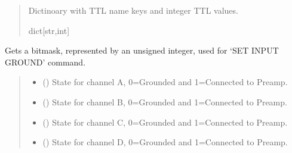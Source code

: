 \documentclass[letterpaper,10pt,english]{sphinxmanual}
\begin{document}
\begin{fulllineitems}
\begin{fulllineitems}
\begin{quote}
\begin{description}
\sphinxAtStartPar
Dictinoary with TTL name keys and integer TTL values.

\sphinxAtStartPar
dict{[}str,int{]}

\end{description}\end{quote}

\end{fulllineitems}


\begin{fulllineitems}
\label{\detokenize{PodDevice_8401HR:PodDevice_8401HR.POD_8401HR.GetChannelBitmask}}
\pysigstartsignatures
{}
\pysigstopsignatures
\sphinxAtStartPar
Gets a bitmask, represented by an unsigned integer, used for ‘SET INPUT GROUND’ command.
\begin{quote}\begin{description}
\begin{itemize}
\item {} 
\sphinxAtStartPar
{} () \textendash{} State for channel A, 0=Grounded and 1=Connected to Preamp.

\item {} 
\sphinxAtStartPar
{} () \textendash{} State for channel B, 0=Grounded and 1=Connected to Preamp.

\item {} 
\sphinxAtStartPar
{} () \textendash{} State for channel C, 0=Grounded and 1=Connected to Preamp.

\item {} 
\sphinxAtStartPar
{} () \textendash{} State for channel D, 0=Grounded and 1=Connected to Preamp.


\end{itemize}
\end{description}
\end{quote}
\end{fulllineitems}
\end{fulllineitems}
\end{document}
